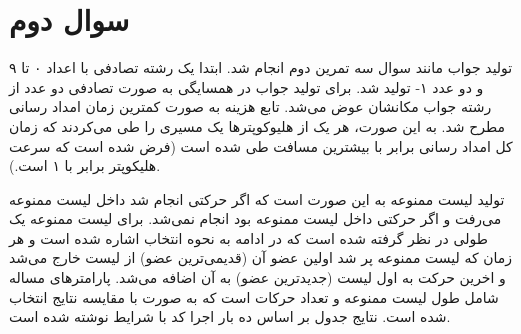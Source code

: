 \section{سوال دوم}
تولید جواب مانند سوال سه تمرین دوم انجام شد. ابتدا یک رشته تصادفی با اعداد ۰ تا ۹ و دو عدد ۱- تولید شد. برای تولید جواب در همسایگی به صورت تصادفی دو عدد از رشته جواب مکانشان عوض می‌شد. تابع هزینه به صورت کمترین زمان امداد رسانی مطرح شد. به این صورت، هر یک از هلیوکوپترها یک مسیری را طی می‌کردند که زمان کل امداد رسانی برابر با بیشترین مسافت طی شده است (فرض شده است که سرعت هلیکوپتر برابر با ۱ است.).

تولید لیست ممنوعه به این صورت است که اگر حرکتی انجام شد داخل لیست ممنوعه می‌رفت و اگر حرکتی داخل لیست ممنوعه بود انجام نمی‌شد. برای لیست ممنوعه یک طولی در نظر گرفته شده است که در ادامه به نحوه انتخاب اشاره شده است و هر زمان که لیست ممنوعه پر شد اولین عضو آن (قدیمی‌ترین عضو) از لیست خارج می‌شد و اخرین حرکت به اول لیست (جدیدترین عضو) به آن اضافه می‌شد. پارامترهای مساله شامل طول لیست ممنوعه و تعداد حرکات است که به صورت 
با مقایسه نتایج انتخاب شده است. نتایج جدول بر اساس ده بار اجرا کد با شرایط نوشته شده است.


